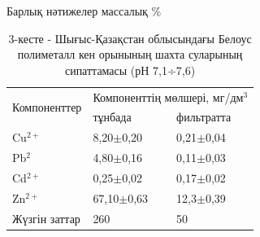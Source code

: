 \begin{table}[H]
\centering
{}
\caption*{Барлық нәтижелер массалық \%}
\caption*{5-сурет - Термоқышқылдық жолмен белсендірілген бентонит сазының микроқұрылымы (а), энергодисперсиондық спектрі (ә), элементтік талдау нәтижелері (в) ағынды сумен әрекеттескеннен кейін}
\end{table}

\begin{table}[H]
\caption*{3-кесте - Шығыс-Қазақстан облысындағы Белоус полиметалл кен орынының шахта суларының сипаттамасы (рН 7,1÷7,6)}
\centering
\begin{tabular}{|l|ll|}
\hline
\multirow{2}{*}{Компоненттер} & \multicolumn{2}{l|}{Компоненттің мөлшері, мг/дм$^{3}$} \\ \cline{2-3}
 & \multicolumn{1}{l|}{тұнбада} & фильтратта \\ \hline
Cu$^{2+}$ & \multicolumn{1}{l|}{8,20$\pm$0,20} & 0,21$\pm$0,04 \\ \hline
Pb$^{2}$ & \multicolumn{1}{l|}{4,80$\pm$0,16} & 0,11$\pm$0,03 \\ \hline
Cd$^{2+}$ & \multicolumn{1}{l|}{0,25$\pm$0,02} & 0,17$\pm$0,02 \\ \hline
Zn$^{2+}$ & \multicolumn{1}{l|}{67,10$\pm$0,63} & 12,3$\pm$0,39 \\ \hline
Жүзгін заттар & \multicolumn{1}{l|}{260} & 50 \\ \hline
\end{tabular}
\end{table}

